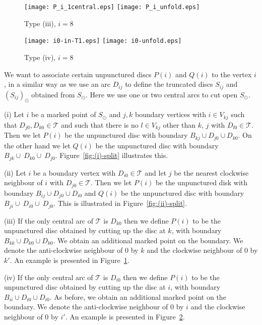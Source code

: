 \documentclass[a4paper]{amsart}
\begin{document}
\begin{figure}
\subfigure
{\texttt{[image: P\_i\_1central.eps]}\label{fig:P_i_1central}}
\hspace{1cm}
\subfigure
{\texttt{[image: P\_i\_unfold.eps]}\label{fig:P_i_unfold}}
\caption{Type (iii), $i=8$}\label{fig:(iii)-split}
\end{figure}

\begin{figure}
\subfigure
{\texttt{[image: i0-in-T1.eps]}\label{fig:i0-in-T1}}
\hspace{1cm}
\subfigure
{\texttt{[image: i0-unfold.eps]}\label{fig:i0-unfold}}
\caption{Type (iv), $i=8$}\label{fig:(iv)-split}
\end{figure}

We want to associate certain unpunctured discs
$P(i)$ and $Q(i)$ to the vertex $i$, in a similar way
as we use an arc $D_{ij}$ to define the truncated discs
$S_{ij}$ and $(S_{ij})_{\odot}$ obtained from $S_{\odot}$.
Here we use one or two central arcs to cut open $S_{\odot}$.

\begin{definition} \label{def:piqi}
(i)
Let $i$ be a marked point of $S_{\odot}$ and $j,k$ 
boundary vertices 
with $i\in V_{kj}$ such that $D_{j0},D_{k0}\in{\mathcal T}$
and such that there is no $l\in V_{kj}$ other than $k$, $j$ 
with $D_{l0}\in{\mathcal T}$.
Then we let $P(i)$ be the unpunctured disc with boundary
$B_{kj}\cup D_{j0}\cup D_{k0}$. 
On the other hand we let $Q(i)$ be the unpunctured disc with
boundary
$B_{jk}\cup\ D_{k0}\cup\ D_{j0}$. Figure~\ref{fig:(i)-split}
illustrates this.

(ii) Let $i$ be  a boundary vertex with $D_{i0}\in {\mathcal T}$ and 
let $j$ be the nearest clockwise neighbour of $i$ with $D_{j0}\in{\mathcal T}$. 
Then we let $P(i)$ be the unpunctured disk with boundary 
$B_{ij}\cup D_{j0}\cup D_{i0}$ and $Q(i)$ be the unpunctured 
disc with boundary  $B_{ji}\cup\ D_{i0}\cup\ D_{j0}$. This 
is illustrated in Figure~\ref{fig:(ii)-split}.

(iii) If the only central arc of
${\mathcal T}$ is $D_{k0}$ then we define $P(i)$ to be the unpunctured disc obtained 
by cutting up the disc at $k$, with boundary $B_{kk}\cup D_{k0}\cup D_{k0}$. 
We obtain an
additional marked point on the boundary. We denote the anti-clockwise
neighbour of $0$ by $k$ and the clockwise neighbour of $0$ by $k'$.
An example is presented in Figure~\ref{fig:(iii)-split}.

(iv) If the only central arc of
${\mathcal T}$ is $D_{i0}$ then we define $P(i)$ to be the unpunctured disc obtained 
by cutting up the disc at $i$, with boundary $B_{ii}\cup D_{i0}\cup D_{i0}$. 
As before, we obtain an additional marked point on the boundary. 
We denote the anti-clockwise
neighbour of $0$ by $i$ and the clockwise neighbour of $0$ by $i'$.
An example is presented in Figure~\ref{fig:(iv)-split}.
\end{definition}
\end{document}
